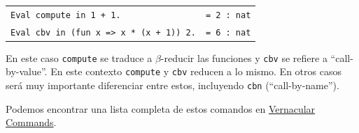 \begin{description}
  \begin{center}
  \begin{tabular}{| l | l |}
  \hline
  \texttt{Eval compute in 1 + 1.} & \texttt{= 2 : nat} \\
  \texttt{Eval cbv in (fun x => x * (x + 1)) 2.} & \texttt{= 6 : nat} \\
  \hline
  \end{tabular}
  \end{center}
  En este caso \texttt{compute} se traduce a $\beta$-reducir las funciones y \texttt{cbv} se refiere a ``call-by-value''. En este contexto \texttt{compute} y \texttt{cbv} reducen a lo mismo. En otros casos será muy importante diferenciar entre estos, incluyendo \texttt{cbn} (``call-by-name'').
\end{description}

Podemos encontrar una lista completa de estos comandos en \href{https://coq.inria.fr/refman/proof-engine/vernacular-commands.html}{Vernacular Commands}.

